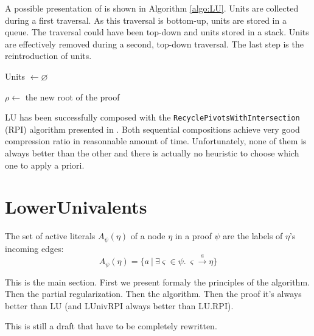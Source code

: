 \documentclass{llncs}
\begin{document}
A possible presentation of {\LowerUnits} is shown in Algorithm \ref{algo:LU}. Units are collected during a
first traversal. As this traversal is bottom-up, units are stored in a queue. The traversal could
have been top-down and units stored in a stack. Units are effectively removed during a second,
top-down traversal. The last step is the reintroduction of units.

\begin{algorithm}[tb]
  Units $\leftarrow \varnothing$ \;



  $\rho \leftarrow$ the new root of the proof \;

  \label{algo:LU}
  \caption{\LowerUnits}
\end{algorithm}

LU has been successfully composed with the \texttt{RecyclePivotsWithIntersection} (RPI) algorithm
presented in \cite{LURPI}. Both sequential compositions achieve very good compression ratio in
reasonnable amount of time. Unfortunately, none of them is always better than the other and there is
actually no heuristic to choose which one to apply a priori.

\section{LowerUnivalents}

\begin{definition}
The set of active literals $A_{\psi}(\eta)$ of a node $\eta$ in a proof $\psi$
are the labels of $\eta$'s incoming edges: 
$$
A_{\psi}(\eta) = \{a \ | \ \exists \varsigma \in \psi. \ \varsigma \xrightarrow{a} \eta \}
$$
\end{definition}

\begin{jb}
This is the main section. First we present formaly the principles of the algorithm. Then the partial
regularization. Then the algorithm. Then the proof it's always better than LU (and LUnivRPI always
better than LU.RPI).

This is still a draft that have to be completely rewritten.
\end{jb}
\end{document}
